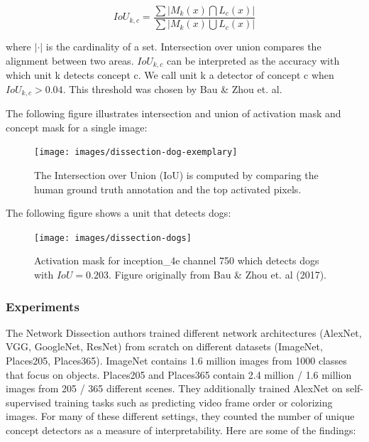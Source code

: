 \documentclass[12pt,]{krantz}
\begin{document}
\[IoU_{k,c}=\frac{\sum|M_k(x)\bigcap{}L_c(x)|}{\sum|M_k(x)\bigcup{}L_c(x)|}\]

where \(|\cdot|\) is the cardinality of a set. Intersection over union
compares the alignment between two areas. \(IoU_{k,c}\) can be
interpreted as the accuracy with which unit k detects concept c. We call
unit k a detector of concept c when \(IoU_{k,c}>0.04\). This threshold
was chosen by Bau \& Zhou et. al.

The following figure illustrates intersection and union of activation
mask and concept mask for a single image:

\begin{figure}

{\centering \texttt{[image: images/dissection-dog-exemplary]} 

}

\caption{The Intersection over Union (IoU) is computed by comparing the human ground truth annotation and the top activated pixels.}\label{fig:unnamed-chunk-56}
\end{figure}

The following figure shows a unit that detects dogs:

\begin{figure}

{\centering \texttt{[image: images/dissection-dogs]} 

}

\caption{Activation mask for inception\_4e channel 750 which detects dogs with $IoU=0.203$. Figure originally from Bau \& Zhou et. al (2017).}\label{fig:unnamed-chunk-57}
\end{figure}

\subsubsection{Experiments}\label{experiments}

The Network Dissection authors trained different network architectures
(AlexNet, VGG, GoogleNet, ResNet) from scratch on different datasets
(ImageNet, Places205, Places365). ImageNet contains 1.6 million images
from 1000 classes that focus on objects. Places205 and Places365 contain
2.4 million / 1.6 million images from 205 / 365 different scenes. They
additionally trained AlexNet on self-supervised training tasks such as
predicting video frame order or colorizing images. For many of these
different settings, they counted the number of unique concept detectors
as a measure of interpretability. Here are some of the findings:
\end{document}

